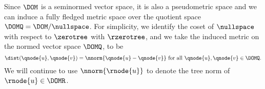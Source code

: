 \begin{definition}
Since $\DOM$ is a seminormed vector space, it is also a pseudometric
space and we can induce a fully fledged metric space over the quotient
space $\DOMQ = \DOM / \nullspace$.
For simplicity, we identify the coset of $\nullspace$ with respect to
$\zerotree$ with $\rzerotree$, and we take the induced metric on the
normed vector space $\DOMQ$, to be \[\dist(\qnode{u},\qnode{v}) =
\nnorm{\qnode{u} - \qnode{v}} \text{ for all }\qnode{u}, \qnode{v} \in
\DOMQ.\]  We will continue to use $\nnorm{\rnode{u}}$ to denote the tree
norm of $\rnode{u}\in\DOMR$.





\end{definition}
